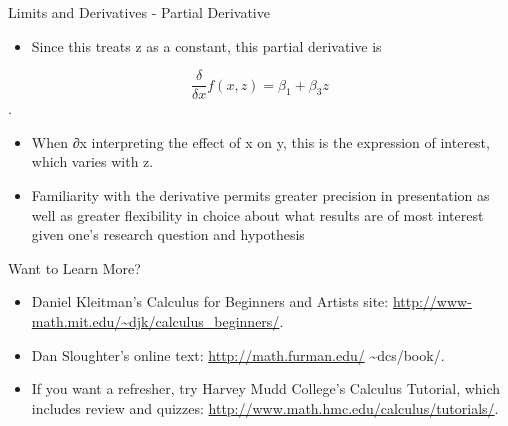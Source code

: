 \documentclass[
  ignorenonframetext,
]{beamer}
\providecommand{\tightlist}{%
  \setlength{\itemsep}{0pt}\setlength{\parskip}{0pt}}
\begin{document}
\begin{frame}{Limits and Derivatives - Partial Derivative}
\protect\hypertarget{limits-and-derivatives---partial-derivative-2}{}

\begin{itemize}
\tightlist
\item
  Since this treats z as a constant, this partial derivative is
\end{itemize}

\[\frac{\delta}{\delta x}f(x,z) = β_{1} +β_{3}z\].

\begin{itemize}
\item
  When ∂x interpreting the effect of x on y, this is the expression of
  interest, which varies with z.
\item
  Familiarity with the derivative permits greater precision in
  presentation as well as greater flexibility in choice about what
  results are of most interest given one's research question and
  hypothesis
\end{itemize}

\end{frame}

\begin{frame}{Want to Learn More?}
\protect\hypertarget{want-to-learn-more}{}

\begin{itemize}
\item
  Daniel Kleitman's Calculus for Beginners and Artists site:
  \url{http://www-math.mit.edu/~djk/calculus_beginners/}.
\item
  Dan Sloughter's online text: \url{http://math.furman.edu/}
  \textasciitilde dcs/book/.
\item
  If you want a refresher, try Harvey Mudd College's Calculus Tutorial,
  which includes review and quizzes:
  \url{http://www.math.hmc.edu/calculus/tutorials/}.
\end{itemize}

\end{frame}
\end{document}
